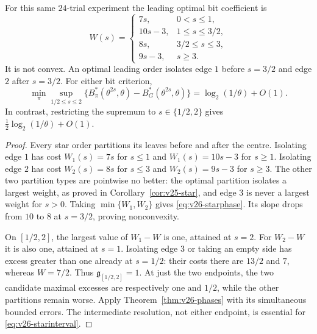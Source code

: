 \begin{corollary}
\label{cor:v26-starphase}
For this same $24$-trial experiment the leading optimal bit coefficient is
\begin{equation}\label{eq:v26-starphase}
 W(s)=\begin{cases}
 7s,&0<s\le1,\\
 10s-3,&1\le s\le3/2,\\
 8s,&3/2\le s\le3,\\
 9s-3,&s\ge3.
 \end{cases}
\end{equation}
It is not convex. An optimal leading order isolates edge $1$ before
$s=3/2$ and edge $2$ after $s=3/2$. For either bit criterion,
\begin{equation}\label{eq:v26-starinterval}
 \min_\pi\sup_{1/2\le s\le2}
 \{B_\pi^*(\theta^{2s},\theta)-B_G^*(\theta^{2s},\theta)\}
                   =\log_2(1/\theta)+O(1).
\end{equation}
In contrast, restricting the supremum to $s\in\{1/2,2\}$ gives
$\tfrac12\log_2(1/\theta)+O(1)$.
\end{corollary}
\begin{proof}
Every star order partitions its leaves before and after the centre.
Isolating edge $1$ has cost
$W_1(s)=7s$ for $s\le1$ and $W_1(s)=10s-3$ for $s\ge1$.
Isolating edge $2$ has cost $W_2(s)=8s$ for $s\le3$ and
$W_2(s)=9s-3$ for $s\ge3$. The other two partition types are
pointwise no better: the optimal partition isolates a largest weight,
as proved in Corollary~\ref{cor:v25-star}, and edge $3$ is never a
largest weight for $s>0$. Taking $\min\{W_1,W_2\}$ gives
\eqref{eq:v26-starphase}. Its slope drops from $10$ to $8$ at
$s=3/2$, proving nonconvexity.

On $[1/2,2]$, the largest value of $W_1-W$ is one, attained at $s=2$.
For $W_2-W$ it is also one, attained at $s=1$. Isolating edge $3$
or taking an empty side has excess greater than one already at
$s=1/2$: their costs there are $13/2$ and $7$, whereas $W=7/2$.
Thus $\mathfrak g_{[1/2,2]}=1$. At just the two endpoints, the two
candidate maximal excesses are respectively one and $1/2$, while the
other partitions remain worse. Apply Theorem~\ref{thm:v26-phases}
with its simultaneous bounded errors. The intermediate resolution,
not either endpoint, is essential for \eqref{eq:v26-starinterval}.
\end{proof}
